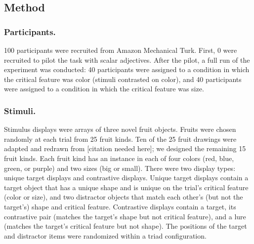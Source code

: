 \documentclass[10pt, letterpaper]{article}
\begin{document}
\subsection{Method}\label{method}

\subsubsection{Participants.}\label{participants.}

100 participants were recruited from Amazon Mechanical Turk. First, 0
were recruited to pilot the task with scalar adjectives. After the
pilot, a full run of the experiment was conducted: 40 participants were
assigned to a condition in which the critical feature was color (stimuli
contrasted on color), and 40 participants were assigned to a condition
in which the critical feature was size.

\subsubsection{Stimuli.}\label{stimuli.}

Stimulus displays were arrays of three novel fruit objects. Fruits were
chosen randomly at each trial from 25 fruit kinds. Ten of the 25 fruit
drawings were adapted and redrawn from {[}citation needed here{]}; we
designed the remaining 15 fruit kinds. Each fruit kind has an instance
in each of four colors (red, blue, green, or purple) and two sizes (big
or small). There were two display types: unique target displays and
contrastive displays. Unique target displays contain a target object
that has a unique shape and is unique on the trial's critical feature
(color or size), and two distractor objects that match each other's (but
not the target's) shape and critical feature. Contrastive displays
contain a target, its contrastive pair (matches the target's shape but
not critical feature), and a lure (matches the target's critical feature
but not shape). The positions of the target and distractor items were
randomized within a triad configuration.
\end{document}
